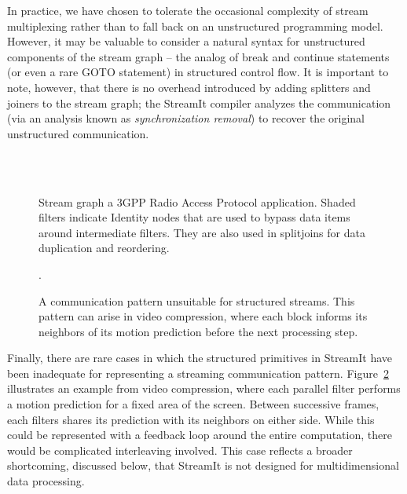   In practice, we have chosen to tolerate the occasional complexity of
  stream multiplexing rather than to fall back on an unstructured
  programming model.  However, it may be valuable to consider a
  natural syntax for unstructured components of the stream graph --
  the analog of break and continue statements (or even a rare GOTO
  statement) in structured control flow. It is important to note,
  however, that there is no overhead introduced by adding splitters
  and joiners to the stream graph; the StreamIt compiler analyzes the
  communication (via an analysis known as {\it synchronization
  removal}) to recover the original unstructured communication.

\begin{figure}[t!]
\vspace{-0.9in} ~ \\
\mbox{~}\hspace{2.03in}\begin{minipage}{4in}
\caption[Use of Identity filters is illustrated by the 3GPP benchmark.]{Stream graph a 3GPP Radio Access
  Protocol application.  Shaded filters indicate Identity nodes that
  are used to bypass data items around intermediate filters.  They are
  also used in splitjoins for data duplication and
  reordering.\protect\label{fig:3gpp}}
\vspace{-0.5in}
\end{minipage}
\end{figure}

\begin{figure}[t]
\centering
{}

\caption[A communication pattern unsuitable for structured streams.]{A
  communication pattern unsuitable for structured streams.  This
  pattern can arise in video compression, where each block informs its
  neighbors of its motion prediction before the next processing
  step.\protect\label{fig:inadequate}}.
\end{figure}

  Finally, there are rare cases in which the structured primitives in
  StreamIt have been inadequate for representing a streaming
  communication pattern.  Figure~\ref{fig:inadequate} illustrates an
  example from video compression, where each parallel filter performs
  a motion prediction for a fixed area of the screen.  Between
  successive frames, each filters shares its prediction with its
  neighbors on either side.  While this could be represented with a
  feedback loop around the entire computation, there would be
  complicated interleaving involved.  This case reflects a broader
  shortcoming, discussed below, that StreamIt is not designed for
  multidimensional data processing.

